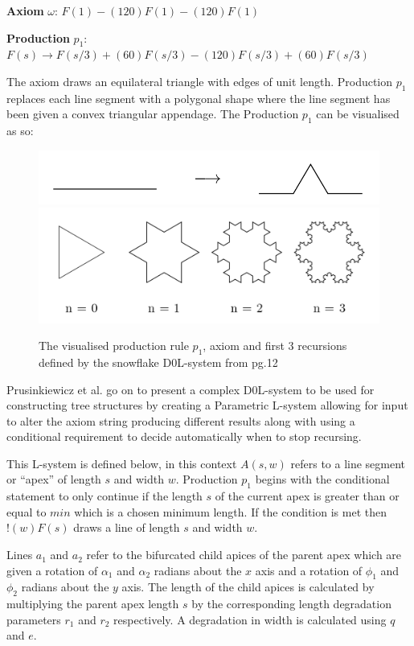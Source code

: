 \documentclass[final]{cmpreport}
\begin{document}
\textbf{Axiom} $\omega$: $F(1) - (120)F(1) - (120)F(1)$ 

\indent \textbf{Production} $p_1$: $F(s) \rightarrow F(s/3) + (60)F(s/3) - (120)F(s/3) + (60)F(s/3)$

The axiom draws an equilateral triangle with edges of unit length. Production $p_1$ replaces 
each line segment with a polygonal shape where the line segment has been given a convex 
triangular appendage. The Production $p_1$ can be visualised as so:

\begin{figure}[ht]
        \includegraphics[scale=0.3]{production_p1.PNG}
        \centering
        \includegraphics[scale=0.4]{triangle_snowflake_lsystem.PNG}
        \centering
        \caption{The visualised production rule $p_1$, axiom and first 3 recursions 
        defined by the snowflake D0L-system from \citep{prusinkiewicz1996systems} pg.12}
        \label{fig:snowflake-lsystem}
\end{figure}

Prusinkiewicz et al. go on to present a complex D0L-system to be used for constructing 
tree structures by creating a Parametric L-system allowing for input to alter the axiom 
string producing different results along with using a conditional requirement to 
decide automatically when to stop recursing. 

This L-system is defined below, in this 
context $A(s, w)$ refers to a line segment or ``apex'' of length $s$ and width $w$. 
Production $p_1$ begins with the conditional statement to only continue if the length $s$ 
of the current apex is greater than or equal to $min$ which is a chosen minimum length. If 
the condition is met then $!(w)F(s)$ draws a line of length $s$ and width $w$. 

Lines $a_1$ and $a_2$ refer to the bifurcated child apices of the parent apex which are 
given a rotation of $\alpha_1$ and $\alpha_2$ radians about the $x$ axis and a rotation of 
$\phi_1$ and $\phi_2$ radians about the $y$ axis. The length of the child apices is calculated 
by multiplying the parent apex length $s$ by the corresponding length degradation parameters 
$r_1$ and $r_2$ respectively. A degradation in width is calculated using $q$ and $e$.
\end{document}
